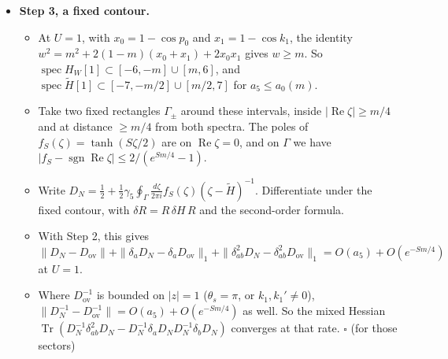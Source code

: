 \documentclass[11pt,a4paper]{article}
\begin{document}
\begin{itemize}
\begin{itemize}
\begin{equation*}
\adjustbox{max width=\linewidth}{$\displaystyle R = \begin{pmatrix} X_{++}^2 B_{++}^{-1} & X_{++} B_{++}^{-1} X_{+-} \\ -X_{-+} X_{++} B_{++}^{-1} & -X_{-+} B_{++}^{-1} X_{+-} \end{pmatrix}.$}
\end{equation*}

\item{} Since $\|X\| < 5$, $Y := I - T_5$ has $\|Y\| \le \frac{1}{2}$ for $a_5 \le \frac{1}{20}$. Then $\tilde{H} = \frac{1}{a_5}\sum_{k \ge 1} Y^k/k = H_W - a_5 R + \frac{1}{a_5}\sum_{k \ge 2} Y^k/k$ converges in norm.
\item{} For distinct links $a \ne b$, $\delta_a X$ has rank $\le 4$ and trace norm $\le 4$, so $\|\delta_a Y\|_1 = O(a_5)$ and $\|\delta^2_{ab} Y\|_1 = O(a_5^2)$.
\item{} Term by term this gives $\|\delta_a \tilde{H} - \delta_a H_W\|_1 = O(a_5)$ and $\|\delta^2_{ab}\tilde{H}\|_1 = O(a_5)$. The $k = 2$ cross term is $\frac{2}{a_5}(C a_5)^2 = O(a_5)$.
\end{itemize}

\item{} {\bfseries\boldmath Step 3, a fixed contour.}
\begin{itemize}
\item{} At $U = 1$, with $x_0 = 1 - \cos p_0$ and $x_1 = 1 - \cos k_1$, the identity $w^2 = m^2 + 2(1 - m)(x_0 + x_1) + 2 x_0 x_1$ gives $w \ge m$. So $\operatorname{spec} H_W[1] \subset [-6, -m] \cup [m, 6]$, and $\operatorname{spec}\tilde{H}[1] \subset [-7, -m/2] \cup [m/2, 7]$ for $a_5 \le a_0(m)$.
\item{} Take two fixed rectangles $\Gamma_\pm$ around these intervals, inside $|\operatorname{Re}\zeta| \ge m/4$ and at distance $\ge m/4$ from both spectra. The poles of $f_S(\zeta) = \tanh(S\zeta/2)$ are on $\operatorname{Re}\zeta = 0$, and on $\Gamma$ we have $|f_S - \operatorname{sgn}\operatorname{Re}\zeta| \le 2/(e^{Sm/4} - 1)$.
\item{} Write $D_N = \frac{1}{2} + \frac{1}{2}\gamma_5 \oint_\Gamma \frac{d\zeta}{2\pi i} f_S(\zeta)(\zeta - \tilde{H})^{-1}$. Differentiate under the fixed contour, with $\delta R = R\,\delta H\,R$ and the second-order formula.
\item{} With Step 2, this gives $\|D_N - D_{\text{ov}}\| + \|\delta_a D_N - \delta_a D_{\text{ov}}\|_1 + \|\delta^2_{ab} D_N - \delta^2_{ab} D_{\text{ov}}\|_1 = O(a_5) + O(e^{-Sm/4})$ at $U = 1$.
\item{} Where $D_{\text{ov}}^{-1}$ is bounded on $|z| = 1$ ($\theta_s = \pi$, or $k_1, k_1' \ne 0$), $\|D_N^{-1} - D_{\text{ov}}^{-1}\| = O(a_5) + O(e^{-Sm/4})$ as well. So the mixed Hessian $\operatorname{Tr}(D_N^{-1}\delta^2_{ab} D_N - D_N^{-1}\delta_a D_N D_N^{-1}\delta_b D_N)$ converges at that rate. $\square$ (for those sectors)
\end{itemize}


\end{itemize}
\end{document}

